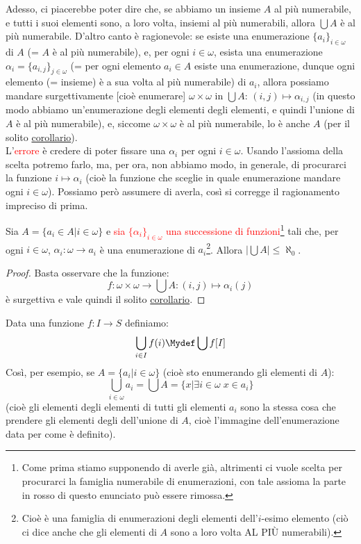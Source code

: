\documentclass[11pt]{scrartcl}
\begin{document}
Adesso, ci piacerebbe poter dire che, se abbiamo un insieme $A$ al più numerabile, e tutti i suoi elementi sono, a loro volta, insiemi al più numerabili, allora
$\bigcup A$ è al più numerabile. D'altro canto è ragionevole: se esiste una enumerazione $\{a_i\}_{i \in \omega}$ di $A$ (= $A$ è al più numerabile), e, per ogni $i \in \omega$, esista una enumerazione $\alpha_i = \{a_{i,j}\}_{j \in \omega}$ (= per ogni elemento $a_i \in A$ esiste 
una enumerazione, dunque ogni elemento (= insieme) è a sua volta al più numerabile)
di $a_i$, allora possiamo mandare surgettivamente [cioè enumerare] $\omega \times \omega$ in $\bigcup A$: $(i,j) \mapsto \alpha_{i,j}$ (in questo modo abbiamo un'enumerazione degli elementi degli elementi, e quindi l'unione di $A$ è al più numerabile), e, siccome $\omega \times \omega$ è al più numerabile, lo è anche $A$ (per il solito \hyperref[disugcardnum]{corollario}).\\
L'\textcolor{red}{errore} è credere di poter fissare una $\alpha_i$ per ogni $i \in \omega$. Usando l'assioma della scelta potremo farlo, ma, per ora, non abbiamo modo, in generale, di procurarci la funzione $i \mapsto \alpha_i$ (cioè la funzione che sceglie in quale enumerazione mandare 
ogni $i \in \omega$). Possiamo però 
assumere di averla, così si corregge il ragionamento impreciso di prima.

\begin{proposition}
	Sia $A = \{a_i \in A| i \in \omega\}$ e \textcolor{red}{sia $\{\alpha_i\}_{i \in \omega}$ una successione di funzioni}\footnote{Come prima stiamo supponendo di averle già, altrimenti ci vuole scelta per procurarci la famiglia numerabile di enumerazioni, con tale assioma la parte in rosso di questo enunciato può essere rimossa.} tali che,
	per ogni $i \in \omega$, $\alpha_i : \omega \rightarrow a_i$ è una enumerazione di $a_i$\footnote{Cioè è una famiglia di enumerazioni degli elementi dell'$i$-esimo elemento (ciò ci dice anche che gli elementi di $A$ sono a loro volta AL PIÙ numerabili).}. Allora $|\bigcup A| \leq \aleph_0$.
\end{proposition}

\begin{proof}
	Basta osservare che la funzione:
	\[ f : \omega \times \omega \longrightarrow \bigcup A : (i,j) \longmapsto \alpha_i(j)
		\]
	è surgettiva e vale quindi il solito \hyperref[disugcardnum]{corollario}.
\end{proof}

\begin{notation}
	Data una funzione $f : I \rightarrow S$ definiamo:
	\[ \bigcup_{i \in I} f(i) \Mydef \bigcup f[I]
		\]
	Così, per esempio, se $A = \{a_i | i \in \omega\}$ (cioè sto enumerando gli elementi di $A$):
	\[ \bigcup_{i \in \omega} a_i = \bigcup A = \{x | \exists i \in \omega \; x \in a_i\}
		\]
	(cioè gli elementi degli elementi di tutti gli elementi $a_i$ sono la stessa cosa che prendere gli elementi degli dell'unione di $A$, cioè l'immagine dell'enumerazione data per come è definito).
\end{notation}
\end{document}
